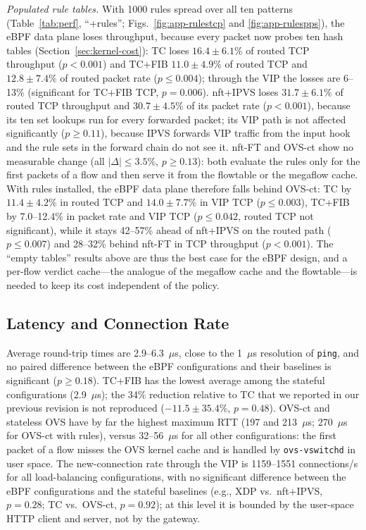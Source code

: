 \documentclass[conference]{IEEEtran}
\begin{document}
\textit{Populated rule tables.} With 1000 rules spread over all ten patterns
(Table~\ref{tab:perf}, ``+rules''; Figs.~\ref{fig:app-rulestcp} and
\ref{fig:app-rulespps}), the eBPF data plane loses throughput, because every
packet now probes ten hash tables (Section~\ref{sec:kernel-cost}): TC loses
$16.4 \pm 6.1\%$ of routed TCP throughput ($p<0.001$) and TC+FIB
$11.0 \pm 4.9\%$ of routed TCP and $12.8 \pm 7.4\%$ of routed packet rate
($p \le 0.004$); through the VIP the losses are 6--13\% (significant for
TC+FIB TCP, $p=0.006$). nft+IPVS loses $31.7 \pm 6.1\%$ of routed TCP
throughput and $30.7 \pm 4.5\%$ of its packet rate ($p<0.001$), because its
ten set lookups run for every forwarded packet; its VIP path is not affected
significantly ($p \ge 0.11$), because IPVS forwards VIP traffic from the
input hook and the rule sets in the forward chain do not see it. nft-FT and
OVS-ct show no measurable change (all $|\Delta| \le 3.5\%$, $p \ge 0.13$):
both evaluate the rules only for the first packets of a flow and then serve
it from the flowtable or the megaflow cache. With rules installed, the eBPF
data plane therefore falls behind OVS-ct: TC by $11.4 \pm 4.2\%$ in routed
TCP and $14.0 \pm 7.7\%$ in VIP TCP ($p \le 0.003$), TC+FIB by 7.0--12.4\%
in packet rate and VIP TCP ($p \le 0.042$, routed TCP not significant), while
it stays 42--57\% ahead of nft+IPVS on the routed path ($p \le 0.007$) and
28--32\% behind nft-FT in TCP throughput ($p<0.001$). The ``empty tables''
results above are thus the best case for the eBPF design, and a per-flow
verdict cache---the analogue of the megaflow cache and the flowtable---is
needed to keep its cost independent of the policy.

\subsection{Latency and Connection Rate}
\label{sec:latency}
Average round-trip times are 2.9--6.3~$\mu$s, close to the 1~$\mu$s
resolution of \texttt{ping}, and no paired difference between the eBPF
configurations and their baselines is significant ($p \ge 0.18$). TC+FIB has
the lowest average among the stateful configurations (2.9~$\mu$s); the 34\%
reduction relative to TC that we reported in our previous revision is not
reproduced ($-11.5 \pm 35.4\%$, $p=0.48$). OVS-ct and stateless OVS have by
far the highest maximum RTT (197 and 213~$\mu$s; 270~$\mu$s for OVS-ct with
rules), versus 32--56~$\mu$s for all other configurations: the first packet
of a flow misses the OVS kernel cache and is handled by
\texttt{ovs-vswitchd} in user space. The new-connection rate through the VIP
is 1159--1551 connections/s for all load-balancing configurations, with no
significant difference between the eBPF configurations and the stateful
baselines (e.g., XDP vs.\ nft+IPVS, $p=0.28$; TC vs.\ OVS-ct, $p=0.92$); at
this level it is bounded by the user-space HTTP client and server, not by the
gateway.
\end{document}
